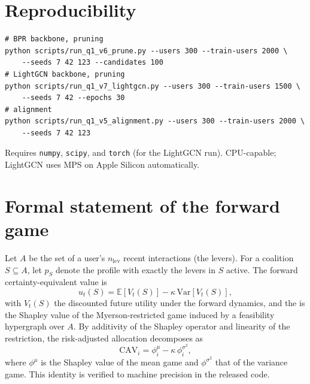 \documentclass[pdflatex,sn-mathphys-num]{sn-jnl}%
\theoremstyle{thmstyleone}%
\theoremstyle{thmstyletwo}%
\theoremstyle{thmstylethree}%
\newcommand{\CAV}{\mathrm{CAV}}
\begin{document}
\begin{appendices}

\section{Reproducibility}
\label{app:repro}

\begin{verbatim}
# BPR backbone, pruning
python scripts/run_q1_v6_prune.py --users 300 --train-users 2000 \
    --seeds 7 42 123 --candidates 100
# LightGCN backbone, pruning
python scripts/run_q1_v7_lightgcn.py --users 300 --train-users 1500 \
    --seeds 7 42 --epochs 30
# alignment
python scripts/run_q1_v5_alignment.py --users 300 --train-users 2000 \
    --seeds 7 42 123
\end{verbatim}

Requires \texttt{numpy}, \texttt{scipy}, and \texttt{torch} (for the LightGCN run). CPU-capable; LightGCN uses MPS on Apple Silicon automatically.

\section{Formal statement of the forward game}
\label{app:game}

Let $A$ be the set of a user's $n_{\mathrm{lev}}$ recent interactions (the levers). For a coalition $S\subseteq A$, let $p_S$ denote the profile with exactly the levers in $S$ active. The forward certainty-equivalent value is
\[
u_t(S) = \mathbb{E}[V_t(S)] - \kappa\,\mathrm{Var}[V_t(S)],
\]
with $V_t(S)$ the discounted future utility under the forward dynamics, and the \CAV{} is the Shapley value of the Myerson-restricted game induced by a feasibility hypergraph over $A$. By additivity of the Shapley operator and linearity of the restriction, the risk-adjusted allocation decomposes as
\[
\CAV{}_i = \phi^{\mu}_i - \kappa\,\phi^{\sigma^2}_i,
\]
where $\phi^{\mu}$ is the Shapley value of the mean game and $\phi^{\sigma^2}$ that of the variance game. This identity is verified to machine precision in the released code.

\end{appendices}
\end{document}
